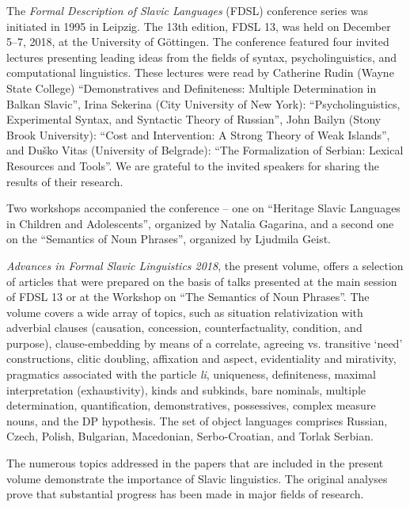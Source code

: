 % 
%
% 

The \textit{Formal Description of Slavic Languages} (FDSL) conference series was initiated in 1995 in Leipzig. The 13th edition, FDSL 13, was held on December 5--7, 2018, at the University of Göttingen. The conference featured four invited lectures presenting leading ideas from the fields of syntax, psycholinguistics, and computational linguistics. These lectures were read by Catherine Rudin (Wayne State College) ``Demonstratives and Definiteness: Multiple Determination in Balkan Slavic'', Irina Sekerina (City University of New York): ``Psycholinguistics, Experimental Syntax, and Syntactic Theory of Russian'', John Bailyn (Stony Brook University): ``Cost and Intervention: A Strong Theory of Weak Islands'', and Duško Vitas (University of Belgrade): ``The Formalization of Serbian: Lexical Resources and Tools''. We are grateful to the invited speakers for sharing the results of their research.

Two workshops accompanied the conference -- one on ``Heritage Slavic Languages in Children and Adolescents'', organized by Natalia Gagarina, and a second one on the ``Semantics of Noun Phrases'', organized by Ljudmila Geist.

\textit{Advances in Formal Slavic Linguistics 2018}, the present volume, offers a selection of articles that were prepared on the basis of talks presented at the main session of FDSL 13 or at the Workshop on ``The Semantics of Noun Phrases''. The volume covers a wide array of topics, such as situation relativization with adverbial clauses (causation, concession, counterfactuality, condition, and purpose), clause-embedding by means of a correlate, agreeing vs. transitive `need' constructions, clitic doubling, affixation and aspect, evidentiality and mirativity, pragmatics associated with the particle \textit{li}, uniqueness, definiteness, maximal interpretation (exhaustivity), kinds and subkinds, bare nominals, multiple determination, quantification, demonstratives, possessives, complex measure nouns, and the DP hypothesis. The set of object languages comprises Russian, Czech, Polish, Bulgarian, Macedonian, Serbo-Croatian, and Torlak Serbian.

The numerous topics addressed in the papers that are included in the present volume demonstrate the importance of Slavic linguistics. The original analyses prove that substantial progress has been made in major fields of research.

